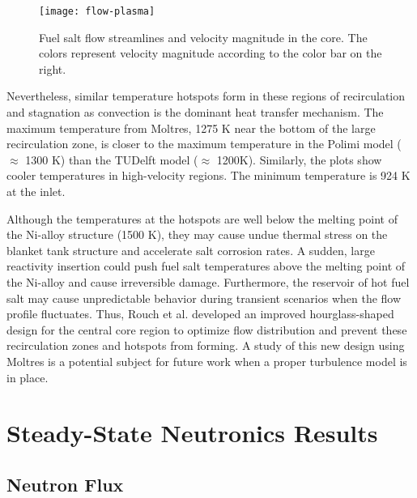 \begin{figure}[htbp!]
    \centering
    \texttt{[image: flow-plasma]}
    \caption{Fuel salt flow streamlines and velocity magnitude in the core.
    The colors represent velocity magnitude according to the color bar on the
    right.}
    \label{fig:flow}
\end{figure}

Nevertheless, similar temperature hotspots form in these regions of
recirculation and stagnation as convection is the dominant heat transfer
mechanism. The maximum temperature from Moltres, 1275 K near the bottom of the
large recirculation zone, is closer to the maximum temperature in the Polimi
model ($\approx$ 1300 K) than the TUDelft model ($\approx$ 1200K). Similarly,
the plots show cooler temperatures in high-velocity regions. The minimum
temperature is 924 K at the inlet. 

Although the temperatures at the hotspots are well below the melting point of the Ni-alloy structure (1500 K), they may cause undue thermal stress on the
blanket tank structure and accelerate salt corrosion rates. A
sudden, large reactivity insertion could push fuel salt temperatures above the
melting point of the Ni-alloy and cause irreversible damage. Furthermore,
the reservoir of hot fuel salt may cause unpredictable behavior during
transient scenarios when the flow profile fluctuates.
Thus, Rouch et al. \cite{rouch_preliminary_2014} developed an improved
hourglass-shaped design for the central core region to optimize flow
distribution and prevent these
recirculation zones and hotspots from forming. A study of this new design
using Moltres is a potential subject for future work when a proper turbulence
model is in place.

\section{Steady-State Neutronics Results}

\subsection{Neutron Flux}

